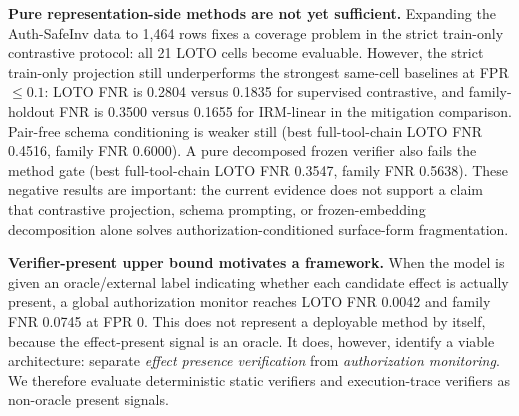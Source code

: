 \documentclass{article}
\begin{document}
\textbf{Pure representation-side methods are not yet sufficient.} Expanding the Auth-SafeInv data to 1,464 rows fixes a coverage problem in the strict train-only contrastive protocol: all 21 LOTO cells become evaluable. However, the strict train-only projection still underperforms the strongest same-cell baselines at FPR $\leq 0.1$: LOTO FNR is 0.2804 versus 0.1835 for supervised contrastive, and family-holdout FNR is 0.3500 versus 0.1655 for IRM-linear in the mitigation comparison. Pair-free schema conditioning is weaker still (best full-tool-chain LOTO FNR 0.4516, family FNR 0.6000). A pure decomposed frozen verifier also fails the method gate (best full-tool-chain LOTO FNR 0.3547, family FNR 0.5638). These negative results are important: the current evidence does not support a claim that contrastive projection, schema prompting, or frozen-embedding decomposition alone solves authorization-conditioned surface-form fragmentation.

\textbf{Verifier-present upper bound motivates a framework.} When the model is given an oracle/external label indicating whether each candidate effect is actually present, a global authorization monitor reaches LOTO FNR 0.0042 and family FNR 0.0745 at FPR 0. This does not represent a deployable method by itself, because the effect-present signal is an oracle. It does, however, identify a viable architecture: separate \emph{effect presence verification} from \emph{authorization monitoring}. We therefore evaluate deterministic static verifiers and execution-trace verifiers as non-oracle present signals.
\end{document}
